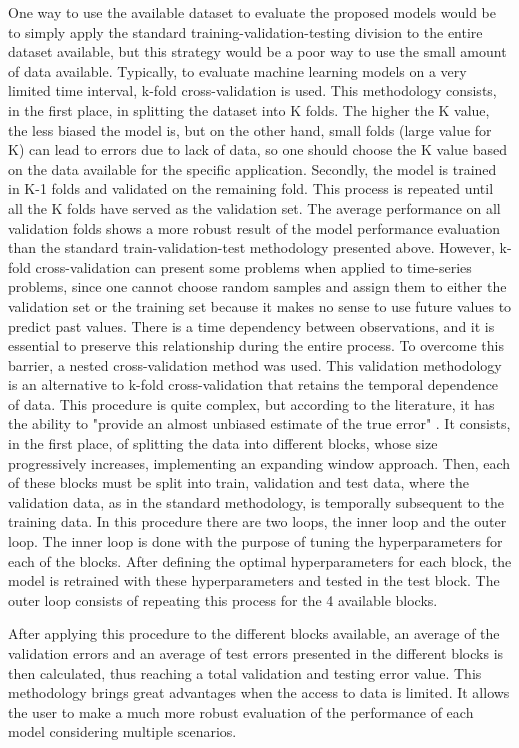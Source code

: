 One way to use the available dataset to evaluate the proposed models would be to simply apply the standard training-validation-testing division to the entire dataset available, but this strategy would be a poor way to use the small amount of data available. Typically, to evaluate machine learning models on a very limited time interval, k-fold cross-validation is used. This methodology consists, in the first place, in splitting the dataset into K folds. The higher the K value, the less biased the model is, but on the other hand, small folds (large value for K) can lead to errors due to lack of data, so one should choose the K value based on the data available for the specific application. Secondly, the model is trained in K-1 folds and validated on the remaining fold. This process is repeated until all the K folds have served as the validation set. The average performance on all validation folds shows a more robust result of the model performance evaluation than the standard train-validation-test methodology presented above. However, k-fold cross-validation can present some problems when applied to time-series problems, since one cannot choose random samples and assign them to either the validation set or the training set because it makes no sense to use future values to predict past values. There is a time dependency between observations, and it is essential to preserve this relationship during the entire process. To overcome this barrier, a nested cross-validation method was used. This validation methodology is an alternative to k-fold cross-validation that retains the temporal dependence of data. This procedure is quite complex, but according to the literature, it has the ability to "provide an almost unbiased estimate of the true error" \cite{nested}. It consists, in the first place, of splitting the data into different blocks, whose size progressively increases, implementing an expanding window approach. Then, each of these blocks must be split into train, validation and test data, where the validation data, as in the standard methodology, is temporally subsequent to the training data. In this procedure there are two loops, the inner loop and the outer loop. The inner loop is done with the purpose of tuning the hyperparameters for each of the blocks. After defining the optimal hyperparameters for each block, the model is retrained with these hyperparameters and tested in the test block. The outer loop consists of repeating this process for the 4 available blocks. 

After applying this procedure to the different blocks available, an average of the validation errors and an average of test errors presented in the different blocks is then calculated, thus reaching a total validation and testing error value. This methodology brings great advantages when the access to data is limited. It allows the user to make a much more robust evaluation of the performance of each model considering multiple scenarios.

